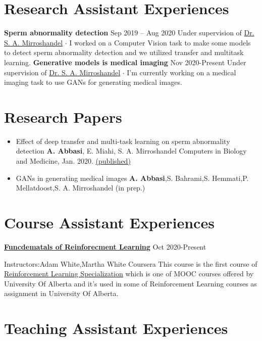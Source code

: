 \documentclass[paper=a4,fontsize=11pt]{scrartcl} %
\newcommand{\NewPart}[1]{\section*{{#1}}}
\begin{document}
\NewPart{Research Assistant Experiences}
\textbf{Sperm abnormality detection} \hfill \footnotesize Sep 2019 – Aug 2020 \newline
Under supervision of \href{https://staff.guilan.ac.ir/mirroshandel/?lg=1}{Dr. S. A. Mirroshandel} \newline
$\cdot$ \footnotesize  I worked on a Computer Vision task to make some models to detect sperm abnormality detection and we utilized transfer and multitask learning. \newline
\newline
\textbf{Generative models is medical imaging} \hfill \footnotesize Nov 2020-Present \newline
Under supervision of \href{https://staff.guilan.ac.ir/mirroshandel/?lg=1}{Dr. S. A. Mirroshandel} \newline
$\cdot$ \footnotesize  I'm currently working on a medical imaging task to use GANs for generating medical images.

\NewPart{Research Papers}
\begin{itemize}

\item Effect of deep transfer and multi-task learning on sperm abnormality detection \newline
\textbf{A. Abbasi}, E. Miahi, S. A. Mirroshandel \newline
Computers in Biology and Medicine, Jan. 2020. \href{https://www.sciencedirect.com/science/article/pii/S0010482520304522}{(published)}

\item GANs in generating medical images \newline
\textbf{A. Abbasi},S. Bahrami,S. Hemmati,P. Mellatdoost,S. A. Mirroshandel (in prep.)
\end{itemize}


\NewPart{Course Assistant Experiences} 

\textbf{ \href{https://www.coursera.org/learn/fundamentals-of-reinforcement-learning}{Funcdematals of Reinforecment Learning}} \footnotesize \hfill Oct 2020-Present
\begin{itemize}
\footnotesize Instructors:Adam White,Martha White \hfill Coursera \newline 
\newline
\footnotesize{This course is the first course of \href{https://www.coursera.org/specializations/reinforcement-learning}{\underline{Reinforcement Learning Specialization}} which is one of MOOC courses offered by University Of Alberta and it's used in some of Reinforcement Learning courses as assignment in University Of Alberta.}
\end{itemize}
\NewPart{Teaching Assistant Experiences}
\end{document}
